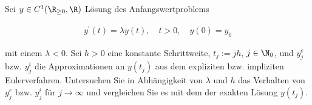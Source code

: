 \begin{exercise}

Sei $y \in C^1(\R_{\geq 0}, \R)$ Lösung des Anfangswertproblems

\begin{align*}
  y^\prime(t) = \lambda y(t),
  \quad
  t > 0,
  \quad
  y(0) = y_0
\end{align*}

mit einem $\lambda < 0$.
Sei $h > 0$ eine konstante Schrittweite, $t_j := jh$, $j \in \N_0$, und $y^e_j$ bzw. $y^i_j$ die Approximationen an $y(t_j)$ aus dem expliziten bzw. impliziten Eulerverfahren.
Untersuchen Sie in Abhängigkeit von $\lambda$ und $h$ das Verhalten von $y^e_j$ bzw. $y^i_j$ für $j \to \infty$ und vergleichen Sie es mit dem der exakten Lösung $y(t_j)$.

\end{exercise}

